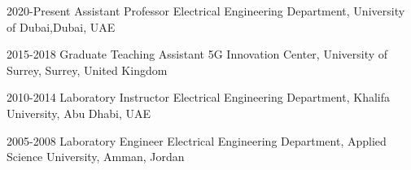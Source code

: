 

\begin{cvskills}

  \cvskill
    {2020-Present} %
    {Assistant Professor} %
    {Electrical Engineering Department, University of Dubai,Dubai, UAE} %
 
    
       
  \cvskill
    {2015-2018} %
    {Graduate Teaching Assistant} %
    {5G Innovation Center, University of Surrey, Surrey, United Kingdom} %

  \cvskill
    {2010-2014} %
    {Laboratory Instructor} %
    {Electrical Engineering Department, Khalifa University, Abu Dhabi, UAE} %

  \cvskill
    {2005-2008} %
    {Laboratory Engineer} %
    {Electrical Engineering Department, Applied Science University, Amman, Jordan} %





\end{cvskills}

